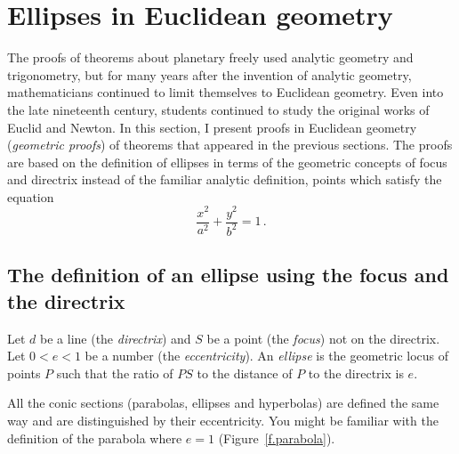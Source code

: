 
\section{Ellipses in Euclidean geometry}\label{s.geometry}

The proofs of theorems about planetary freely used analytic geometry and trigonometry, but for many years after the invention of analytic geometry, mathematicians continued to limit themselves to Euclidean geometry. Even into the late nineteenth century, students continued to study the original works of Euclid and Newton. In this section, I present proofs in Euclidean geometry (\emph{geometric proofs}) of theorems that appeared in the previous sections. The proofs are based on the definition of ellipses in terms of the geometric concepts of focus and directrix instead of the familiar analytic definition, points which satisfy the equation
\[
\frac{x^2}{a^2}+\frac{y^2}{b^2}=1\,.
\]


\subsection{The definition of an ellipse using the focus and the directrix}

\begin{definition}
Let $d$ be a line (the \emph{directrix}) and $S$ be a point (the \emph{focus}) not on the directrix. Let $0<e<1$ be a number (the \emph{eccentricity}). An \emph{ellipse} is the geometric locus of points $P$ such that the ratio of  $PS$ to the distance of $P$ to the directrix is $e$.
\end{definition}

All the conic sections (parabolas, ellipses and hyperbolas) are defined the same way and are distinguished by their eccentricity. You might be familiar with the definition of the parabola where $e=1$ (Figure~\ref{f.parabola}).

